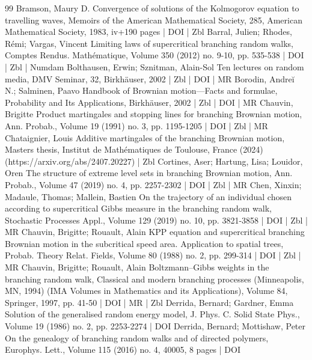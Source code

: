 \begin{thebibliography}{99}
 Bramson, Maury D. Convergence of solutions of the Kolmogorov equation to travelling waves, Memoirs of the American Mathematical Society, 285, American Mathematical Society, 1983, iv+190 pages | DOI | Zbl
 Barral, Julien; Rhodes, Rémi; Vargas, Vincent Limiting laws of supercritical branching random walks, Comptes Rendus. Mathématique, Volume 350 (2012) no. 9-10, pp. 535-538 | DOI | Zbl | Numdam
 Bolthausen, Erwin; Sznitman, Alain-Sol Ten lectures on random media, DMV Seminar, 32, Birkhäuser, 2002 | Zbl | DOI | MR
 Borodin, Andreĭ N.; Salminen, Paavo Handbook of Brownian motion—Facts and formulae, Probability and Its Applications, Birkhäuser, 2002 | Zbl | DOI | MR
 Chauvin, Brigitte Product martingales and stopping lines for branching Brownian motion, Ann. Probab., Volume 19 (1991) no. 3, pp. 1195-1205 | DOI | Zbl | MR
 Chataignier, Louis Additive martingales of the branching Brownian motion, Masters thesis, Institut de Mathématiques de Toulouse, France (2024) (https://arxiv.org/abs/2407.20227) | Zbl
 Cortines, Aser; Hartung, Lisa; Louidor, Oren The structure of extreme level sets in branching Brownian motion, Ann. Probab., Volume 47 (2019) no. 4, pp. 2257-2302 | DOI | Zbl | MR
 Chen, Xinxin; Madaule, Thomas; Mallein, Bastien On the trajectory of an individual chosen according to supercritical Gibbs measure in the branching random walk, Stochastic Processes Appl., Volume 129 (2019) no. 10, pp. 3821-3858 | DOI | Zbl | MR
 Chauvin, Brigitte; Rouault, Alain KPP equation and supercritical branching Brownian motion in the subcritical speed area. Application to spatial trees, Probab. Theory Relat. Fields, Volume 80 (1988) no. 2, pp. 299-314 | DOI | Zbl | MR
 Chauvin, Brigitte; Rouault, Alain Boltzmann–Gibbs weights in the branching random walk, Classical and modern branching processes (Minneapolis, MN, 1994) (IMA Volumes in Mathematics and its Applications), Volume 84, Springer, 1997, pp. 41-50 | DOI | MR | Zbl
 Derrida, Bernard; Gardner, Emma Solution of the generalised random energy model, J. Phys. C. Solid State Phys., Volume 19 (1986) no. 2, pp. 2253-2274 | DOI
 Derrida, Bernard; Mottishaw, Peter On the genealogy of branching random walks and of directed polymers, Europhys. Lett., Volume 115 (2016) no. 4, 40005, 8 pages | DOI

\end{thebibliography}
